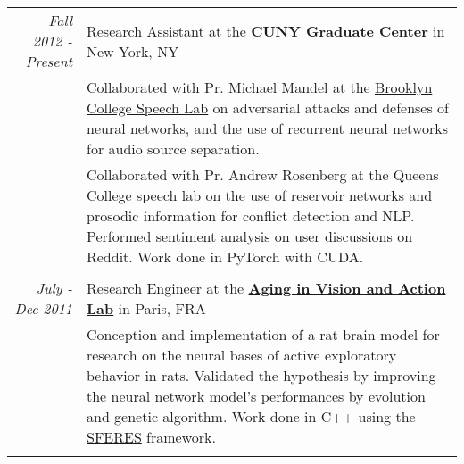 \documentclass[a4paper,10pt]{article}
\begin{document}
\begin{tabular}{r|p{14cm}}
        \emph{Fall 2012 - Present} & Research Assistant at the {\bfseries CUNY Graduate Center} in New York, NY \\
        & \small{Collaborated with Pr. Michael Mandel at the \href{https://www.gc.cuny.edu/CUNY_GC/media/Computer-Science/SpeechLab.pdf}{Brooklyn College Speech Lab} on adversarial attacks and defenses of neural networks, and the use of recurrent neural networks for audio source separation.}\\
        & \small{Collaborated with Pr. Andrew Rosenberg at the Queens College speech lab on the use of reservoir networks and prosodic information for conflict detection and NLP. Performed sentiment analysis on user discussions on Reddit. Work done in PyTorch with CUDA.}\\
        \multicolumn{2}{c}{} \\

        \emph{July - Dec 2011} & Research Engineer at the {\bfseries \href{http://www.aging-vision-action.fr/}{Aging in Vision and Action Lab} }in Paris, FRA\\
        & \small{Conception and implementation of a rat brain model for research on the neural bases of active exploratory behavior in rats. Validated the hypothesis by improving the neural network model's performances by evolution and genetic algorithm. Work done in C++ using the \href{https://github.com/sferes2/sferes2}{SFERES} framework.}\\
        \multicolumn{2}{c}{} \\


    \end{tabular}
\end{document}
